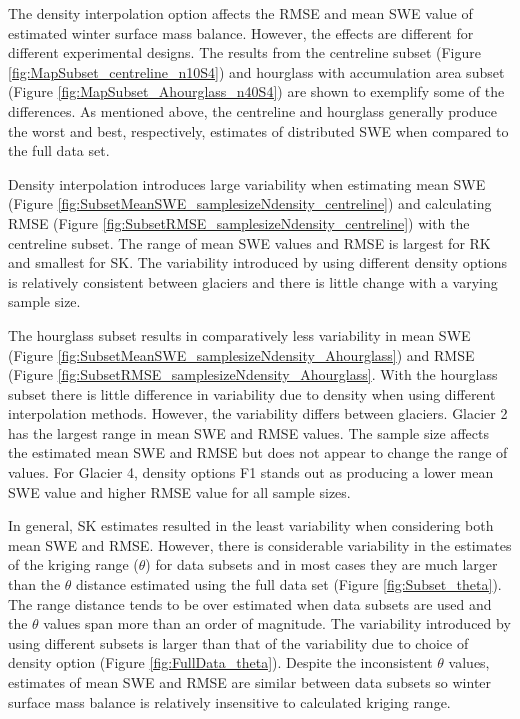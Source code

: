 \documentclass[12pt]{article}
\begin{document}
The density interpolation option affects the RMSE and mean SWE value of estimated winter surface mass balance. However, the effects are different for different experimental designs. The results from the centreline subset (Figure \ref{fig:MapSubset_centreline_n10S4}) and hourglass with accumulation area subset (Figure \ref{fig:MapSubset_Ahourglass_n40S4}) are shown to exemplify some of the differences. As mentioned above, the centreline and hourglass generally produce the worst and best, respectively, estimates of distributed SWE when compared to the full data set.

Density interpolation introduces large variability when estimating mean SWE (Figure \ref{fig:SubsetMeanSWE_samplesizeNdensity_centreline}) and calculating RMSE (Figure \ref{fig:SubsetRMSE_samplesizeNdensity_centreline}) with the centreline subset. The range of mean SWE values and RMSE is largest for RK and smallest for SK. The variability introduced by using different density options is relatively consistent between glaciers and there is little change with a varying sample size. 

The hourglass subset results in comparatively less variability in mean SWE (Figure \ref{fig:SubsetMeanSWE_samplesizeNdensity_Ahourglass}) and RMSE (Figure \ref{fig:SubsetRMSE_samplesizeNdensity_Ahourglass}. With the hourglass subset there is little difference in variability due to density when using different interpolation methods. However, the variability differs between glaciers. Glacier 2 has the largest range in mean SWE and RMSE values. The sample size affects the estimated mean SWE and RMSE but does not appear to change the range of values. For Glacier 4, density options F1 stands out as producing a lower mean SWE value and higher RMSE value for all sample sizes. 

In general, SK estimates resulted in the least variability when considering both mean SWE and RMSE. However, there is considerable variability in the estimates of the kriging range ($\theta$) for data subsets and in most cases they are much larger than the $\theta$ distance estimated using the full data set (Figure \ref{fig:Subset_theta}). The range distance tends to be over estimated when data subsets are used and the $\theta$ values span more than an order of magnitude. The variability introduced by using different subsets is larger than that of the variability due to choice of density option (Figure \ref{fig:FullData_theta}). Despite the inconsistent $\theta$ values, estimates of mean SWE and RMSE are similar between data subsets so winter surface mass balance is relatively insensitive to calculated kriging range. 
\end{document}
